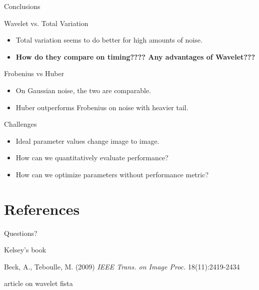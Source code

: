 \documentclass[12pt]{beamer}
\begin{document}
\begin{frame}{Conclusions}

\begin{block}{Wavelet vs. Total Variation}
\begin{itemize}
\item Total variation seems to do better for high amounts of noise.
\item \textbf{How do they compare on timing????  Any advantages of Wavelet???}
\end{itemize}
\end{block}

\begin{block}{Frobenius vs Huber}
\begin{itemize}
\item On Gaussian noise, the two are comparable.
\item Huber outperforms Frobenius on noise with heavier tail.
\end{itemize}
\end{block}

\begin{block}{Challenges}
\begin{itemize}
\item Ideal parameter values change image to image.
\item How can we quantitatively evaluate performance?
\item How can we optimize parameters without performance metric?
\end{itemize}
\end{block}

\end{frame}

\section*{References}
\begin{frame}{\Huge Questions?}
\begin{thebibliography}{10}    

\beamertemplatebookbibitems %
 Kelsey's book

\beamertemplatearticlebibitems %
  Beck, A., Teboulle, M. (2009) \textit{IEEE Trans. on Image Proc.} 18(11):2419-2434

 article on wavelet fista

\end{thebibliography}
\end{frame}
\end{document}
